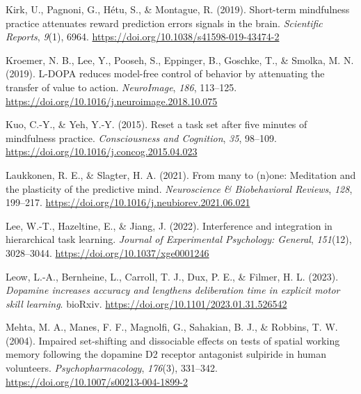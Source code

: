 \documentclass[
  man]{apa6}
\newlength{\cslhangindent}
\newlength{\cslentryspacingunit} %
\newenvironment{CSLReferences}[2] %
 {%
  \setlength{\parindent}{0pt}
  \ifodd #1
  \let\oldpar\par
  \def\par{\hangindent=\cslhangindent\oldpar}
  \fi
  \setlength{\parskip}{#2\cslentryspacingunit}
 }%
 {}
\begin{document}
\begin{CSLReferences}{1}{0}
\leavevmode{}%
Kirk, U., Pagnoni, G., Hétu, S., \& Montague, R. (2019). Short-term mindfulness practice attenuates reward prediction errors signals in the brain. \emph{Scientific Reports}, \emph{9}(1), 6964. \url{https://doi.org/10.1038/s41598-019-43474-2}

\leavevmode{}%
Kroemer, N. B., Lee, Y., Pooseh, S., Eppinger, B., Goschke, T., \& Smolka, M. N. (2019). L-{DOPA} reduces model-free control of behavior by attenuating the transfer of value to action. \emph{NeuroImage}, \emph{186}, 113--125. \url{https://doi.org/10.1016/j.neuroimage.2018.10.075}

\leavevmode{}%
Kuo, C.-Y., \& Yeh, Y.-Y. (2015). Reset a task set after five minutes of mindfulness practice. \emph{Consciousness and Cognition}, \emph{35}, 98--109. \url{https://doi.org/10.1016/j.concog.2015.04.023}

\leavevmode{}%
Laukkonen, R. E., \& Slagter, H. A. (2021). From many to (n)one: {Meditation} and the plasticity of the predictive mind. \emph{Neuroscience \& Biobehavioral Reviews}, \emph{128}, 199--217. \url{https://doi.org/10.1016/j.neubiorev.2021.06.021}

\leavevmode{}%
Lee, W.-T., Hazeltine, E., \& Jiang, J. (2022). Interference and integration in hierarchical task learning. \emph{Journal of Experimental Psychology: General}, \emph{151}(12), 3028--3044. \url{https://doi.org/10.1037/xge0001246}

\leavevmode{}%
Leow, L.-A., Bernheine, L., Carroll, T. J., Dux, P. E., \& Filmer, H. L. (2023). \emph{Dopamine increases accuracy and lengthens deliberation time in explicit motor skill learning}. {bioRxiv}. \url{https://doi.org/10.1101/2023.01.31.526542}

\leavevmode{}%
Mehta, M. A., Manes, F. F., Magnolfi, G., Sahakian, B. J., \& Robbins, T. W. (2004). Impaired set-shifting and dissociable effects on tests of spatial working memory following the dopamine {D2} receptor antagonist sulpiride in human volunteers. \emph{Psychopharmacology}, \emph{176}(3), 331--342. \url{https://doi.org/10.1007/s00213-004-1899-2}


\end{CSLReferences}
\end{document}
